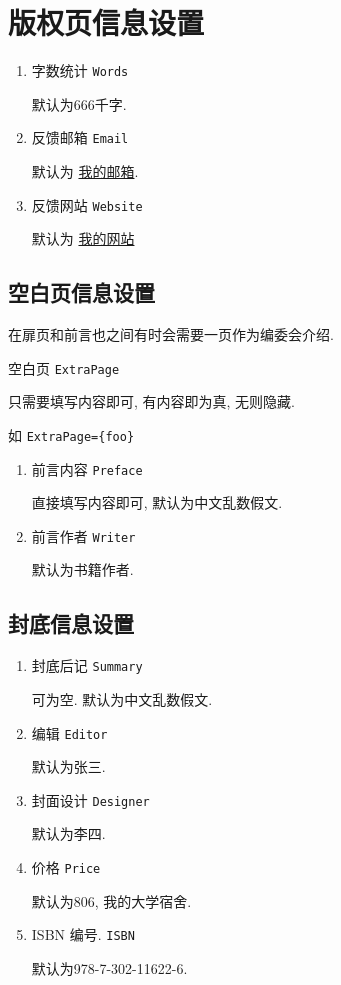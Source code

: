   \section{版权页信息设置} \label{sec:版权页信息设置}
    \begin{enumerate}
      \item 字数统计 \verb|Words|

        默认为666千字.

      \item 反馈邮箱 \verb|Email|

        默认为 \href{mailto:htharoldht@Gmail.com}{我的邮箱}.

      \item 反馈网站 \verb|Website|

        默认为 \href{https://htharoldht.com}{我的网站}
    \end{enumerate}

  \subsection{空白页信息设置} \label{sbsec:空白页信息设置}
    在扉页和前言也之间有时会需要一页作为编委会介绍.

    空白页 \verb|ExtraPage|

    只需要填写内容即可, 有内容即为真, 无则隐藏.

    如 \verb|ExtraPage={foo}|

    \begin{enumerate}
      \item 前言内容 \verb|Preface|

        直接填写内容即可, 默认为中文乱数假文.

      \item 前言作者 \verb|Writer|

        默认为书籍作者.
    \end{enumerate}

  \subsection{封底信息设置} \label{sbsec:封底信息设置}
    \begin{enumerate}
      \item 封底后记 \verb|Summary|

        可为空. 默认为中文乱数假文.

      \item 编辑 \verb|Editor|

        默认为张三.

      \item 封面设计 \verb|Designer|

        默认为李四.

      \item 价格 \verb|Price|

        默认为806, 我的大学宿舍.

      \item ISBN 编号. \verb|ISBN|

        默认为978-7-302-11622-6.
    \end{enumerate}

